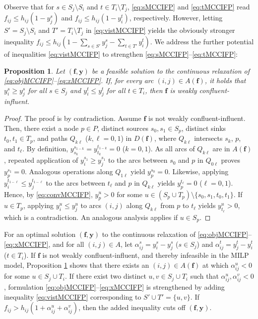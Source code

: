 \documentclass[pdflatex,sn-mathphys-num]{sn-jnl}%
\theoremstyle{thmstyleone}%
\newtheorem{proposition}[theorem]{Proposition}%
\begin{document}
Observe that for $s\in S_j\setminus S_i$ and $t\in T_i\setminus T_j$, \eqref{eq:sMCCIFP} and \eqref{eq:tMCCIFP} read $f_{ij}\leq h_{ij}(1-y_j^s)$ and $f_{ij}\leq h_{ij}(1-y_i^t)$, respectively.
However, letting $S'=S_j\setminus S_i$ and $T'=T_i\setminus T_j$ in \eqref{eq:vistMCCIFP} yields the obviously stronger inequality
$f_{ij}\leq h_{ij}\left(1-\sum_{s\in S'}y_j^s-\sum_{t\in T'}y_i^t\right)$.
We address the further potential of inequalities \eqref{eq:vistMCCIFP} to strengthen \eqref{eq:sMCCIFP}--\eqref{eq:tMCCIFP}:
\begin{proposition} \label{prop:strong}
Let $(\boldsymbol{f},\boldsymbol{y})$ be a feasible solution to the continuous relaxation of \eqref{eq:objMCCIFP}--\eqref{eq:xMCCIFP}.
If, for every arc $(i,j)\in A(\boldsymbol{f})$, it holds that $y_i^s\geq y_j^s$ for all $s\in S_j$ and $y_i^t\leq y_j^t$ for all $t\in T_i$,
then $\boldsymbol{f}$ is weakly confluent-influent.
\end{proposition}
\begin{proof}
The proof is by contradiction.
Assume $\boldsymbol{f}$ is not weakly confluent-influent. Then, there exist a node $p\in P$,
distinct sources $s_0,s_1\in S_p$, distinct sinks $t_0,t_1\in T_p$, and paths $Q_{k\ell}$ ($k,\ell=0,1$) in $D(\boldsymbol{f})$,
where $Q_{k\ell}$ intersects $s_k$, $p$, and $t_{\ell}$.
By definition, $y_{s_k}^{s_{1-k}}=y_{t_k}^{t_{1-k}}=0$ ($k=0,1$).
As all arcs of $Q_{k\ell}$ are in $A(\boldsymbol{f})$, repeated application of $y_i^{s_1}\geq y_j^{s_1}$ to the arcs between $s_0$ and $p$ in $Q_{0\ell}$
proves $y_p^{s_1}=0$. Analogous operations along $Q_{1\ell}$ yield $y_p^{s_0}=0$.
Likewise, applying $y_i^{t_{1-\ell}}\leq y_j^{t_{1-\ell}}$ to the arcs between $t_{\ell}$ and $p$ in $Q_{k\ell}$ yields $y_p^{t_{\ell}}=0$ ($\ell=0,1$).
Hence, by \eqref{eq:convMCCIFP}, $y_p^u>0$ for some $u\in (S_p\cup T_p)\setminus\{s_0,s_1,t_0,t_1\}$.
If $u\in T_p$, applying $y_i^u\leq y_j^u$ to arcs $(i,j)$ along $Q_{k\ell}$ from $p$ to $t_{\ell}$ yields $y_{t_{\ell}}^u>0$, which is a contradiction.
An analogous analysis applies if $u\in S_p$.
\end{proof}

For an optimal solution $(\boldsymbol{f},\boldsymbol{y})$ to the continuous relaxation of \eqref{eq:objMCCIFP}--\eqref{eq:xMCCIFP},
and for all $(i,j)\in A$, let $\alpha_{ij}^s=y_i^s-y_j^s$ ($s\in S_j$) and $\alpha_{ij}^t=y_j^t-y_i^t$ ($t\in T_i$).
If $\boldsymbol{f}$ is not weakly confluent-influent, and thereby infeasible in the MILP model,
Proposition \ref{prop:strong} shows that there exists an $(i,j)\in A(\boldsymbol{f})$ at which $\alpha_{ij}^u<0$ for some $u\in S_j\cup T_i$.
If there exist two distinct $u,v\in S_j\cup T_i$ such that $\alpha_{ij}^u,\alpha_{ij}^v<0$,
formulation \eqref{eq:objMCCIFP}--\eqref{eq:xMCCIFP} is strengthened by adding inequality \eqref{eq:vistMCCIFP} corresponding to $S'\cup T'=\{u,v\}$.
If $f_{ij}>h_{ij}\left(1+\alpha_{ij}^u+\alpha_{ij}^v\right)$, then the added inequality cuts off $(\boldsymbol{f},\boldsymbol{y})$.
\end{document}
